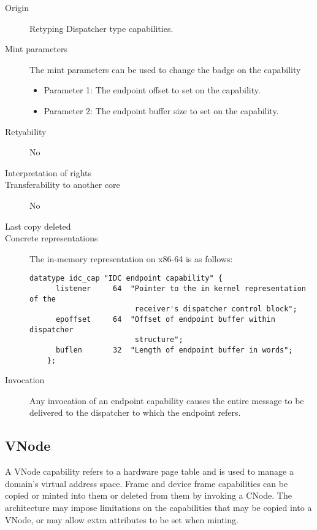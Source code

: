 \begin{description}
\item[Origin] Retyping Dispatcher type capabilities.

\item[Mint parameters] The mint parameters can be used to change the
  badge on the capability
  \begin{itemize}
  \item Parameter 1: The endpoint offset to set on the capability.
  \item Parameter 2: The endpoint buffer size to set on the capability.
  \end{itemize}
  
\item[Retyability] No
  
\item[Interpretation of rights] 
  
\item[Transferability to another core] No

\item[Last copy deleted] 
  
\item[Concrete representations] The in-memory representation on x86-64
  is as follows:
  
  \begin{lstlisting}[language=Mackerel]
    datatype idc_cap "IDC endpoint capability" {
      listener     64  "Pointer to the in kernel representation of the
                        receiver's dispatcher control block";
      epoffset     64  "Offset of endpoint buffer within dispatcher
                        structure";
      buflen       32  "Length of endpoint buffer in words";
    };
  \end{lstlisting}
  
\item[Invocation] Any invocation of an endpoint capability causes the
  entire message to be delivered to the dispatcher to which the
  endpoint refers.
  \end{description}

\subsection{VNode}
A VNode capability refers to a hardware page table and is used to
manage a domain's virtual address space.  Frame and device frame
capabilities can be copied or minted into them or deleted from them by
invoking a CNode.  The architecture may impose limitations on the
capabilities that may be copied into a VNode, or may allow extra
attributes to be set when minting.

